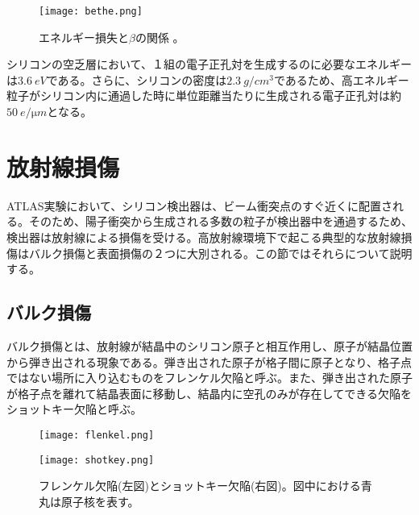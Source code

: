 \begin{figure}[tbp]
  \centering
  \texttt{[image: bethe.png]}
  \caption[エネルギー損失と$\beta$の関係。]{エネルギー損失と$\beta$の関係 \cite{bethe}。}
  \label{fig:bethe}
\end{figure}

シリコンの空乏層において、１組の電子正孔対を生成するのに必要なエネルギーは$3.6\ \si{eV}$である。さらに、シリコンの密度は$2.3\ \si{g/cm^3}$であるため、高エネルギー粒子がシリコン内に通過した時に単位距離当たりに生成される電子正孔対は約$50\ \si{e / \micro m}$となる。

\section{放射線損傷}
\label{sec:houshasennsonnshou}
ATLAS実験において、シリコン検出器は、ビーム衝突点のすぐ近くに配置される。そのため、陽子衝突から生成される多数の粒子が検出器中を通過するため、検出器は放射線による損傷を受ける。高放射線環境下で起こる典型的な放射線損傷はバルク損傷と表面損傷の２つに大別される。この節ではそれらについて説明する。


\subsection{バルク損傷}
\label{sec:baruku}
バルク損傷とは、放射線が結晶中のシリコン原子と相互作用し、原子が結晶位置から弾き出される現象である。弾き出された原子が格子間に原子となり、格子点ではない場所に入り込むものをフレンケル欠陥と呼ぶ。また、弾き出された原子が格子点を離れて結晶表面に移動し、結晶内に空孔のみが存在してできる欠陥をショットキー欠陥と呼ぶ。
\begin{figure}[tbp]
  \begin{minipage}[b]{0.45\linewidth}
    \centering
    \texttt{[image: flenkel.png]}
  \end{minipage}
  \begin{minipage}[b]{0.45\linewidth}
    \centering
    \texttt{[image: shotkey.png]}
  \end{minipage}
  \caption[フレンケル欠陥とショットキー欠陥]{フレンケル欠陥(左図)とショットキー欠陥(右図)。図中における青丸は原子核を表す。}
  \label{fig:kekkan}
\end{figure}


